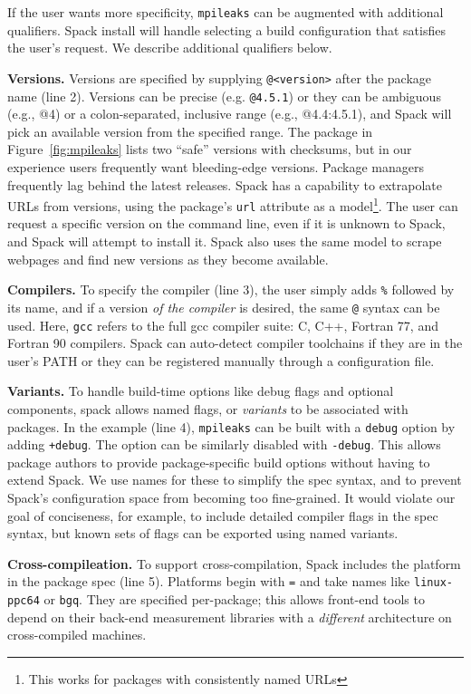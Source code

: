 If the user wants more specificity, {\tt mpileaks} can be augmented with additional
qualifiers.  Spack install will handle selecting a build configuration that satisfies
the user's request.  We describe additional qualifiers below.

{\bf Versions.}
Versions are specified by supplying {\tt @<version>} after the package name (line 2). 
Versions can be precise (e.g. {\tt @4.5.1}) or 
they can be ambiguous (e.g., @4) or a colon-separated, inclusive range (e.g., @4.4:4.5.1),
and Spack will pick an available version from the specified range.
The package in Figure~\ref{fig:mpileaks} lists two ``safe'' versions with checksums, but
in our experience users frequently want bleeding-edge versions.  Package managers
frequently lag behind the latest releases. 
Spack has a capability to extrapolate URLs from versions,
using the package's {\tt url} attribute as a model\footnote{This works
for packages with consistently named URLs}.  The user can request a specific
version on the command line, even if it is unknown to Spack,
and Spack will attempt to install it.  Spack also uses the same
model to scrape webpages and find new versions as they become available.

{\bf Compilers.}
To specify the compiler (line 3), the user
simply adds {\tt \%} followed by its name, and if a version {\it of the compiler} 
is desired, the same {\tt @} syntax can be used.  Here, {\tt gcc} refers to the full
gcc compiler suite: C, C++, Fortran 77, and Fortran 90 compilers.  Spack can auto-detect
compiler toolchains if they are in the user's PATH or they can be registered manually
through a configuration file.

{\bf Variants.}
To handle build-time options like debug flags and optional components, spack
allows named flags, or {\it variants} to be associated with packages.  
In the example (line 4), {\tt mpileaks} can be built with a {\tt debug} option by
adding {\tt +debug}.  The option can be similarly disabled with {\tt -debug}.  
This allows package authors to provide package-specific build options without 
having to extend Spack.  We use names for these to simplify the spec
syntax, and to prevent Spack's configuration space from becoming too fine-grained.
It would violate our goal of conciseness, for example, to include detailed 
compiler flags in the spec syntax, but known sets of flags can be exported using
named variants.

{\bf Cross-compileation.}
To support cross-compilation, Spack includes the platform in the package spec (line 5).
Platforms begin with {\tt =} and take names like {\tt linux-ppc64} or {\tt bgq}.  They are
specified per-package; this allows front-end tools to depend on their back-end measurement
libraries with a {\it different} architecture on cross-compiled machines.

